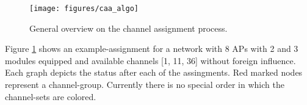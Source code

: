     \begin{figure}[h!]
      \centering
      \texttt{[image: figures/caa\_algo]}
      \caption{General overview on the channel assignment process.}
      \label{fig:caa_algo}
    \end{figure}

    Figure \ref{fig:caa_algo} shows an example-assignment for a network with 8 APs with 2 and 3 modules equipped and available channels [1, 11, 36] without foreign influence. 
    Each graph depicts the status after each of the assingments. 
    Red marked nodes represent a channel-group. 
    Currently there is no special order in which the channel-sets are colored. 
